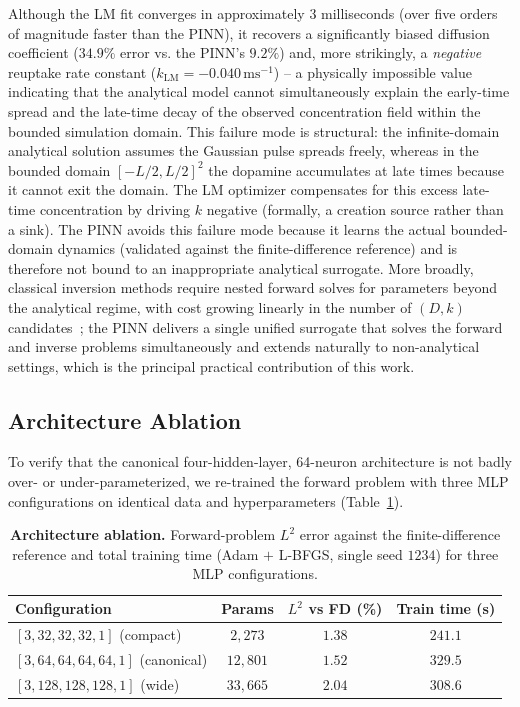 \documentclass[12pt]{article}
\begin{document}
Although the LM fit converges in approximately $3$ milliseconds (over
five orders of magnitude faster than the PINN), it recovers a
significantly biased diffusion coefficient ($34.9\%$ error vs. the
PINN's $9.2\%$) and, more strikingly, a \emph{negative} reuptake rate
constant ($k_{\mathrm{LM}} = -0.040\,\text{ms}^{-1}$) -- a physically
impossible value indicating that the analytical model cannot
simultaneously explain the early-time spread and the late-time decay of
the observed concentration field within the bounded simulation domain.
This failure mode is structural: the infinite-domain analytical
solution assumes the Gaussian pulse spreads freely, whereas in the
bounded domain $[-L/2, L/2]^2$ the dopamine accumulates at late times
because it cannot exit the domain. The LM optimizer compensates for
this excess late-time concentration by driving $k$ negative (formally,
a creation source rather than a sink). The PINN avoids this failure
mode because it learns the actual bounded-domain dynamics (validated
against the finite-difference reference) and is therefore not bound to
an inappropriate analytical surrogate. More broadly, classical
inversion methods require nested forward solves for parameters
beyond the analytical regime, with cost growing linearly in the number
of $(D, k)$ candidates~\cite{Wiencke2020}; the PINN delivers a
single unified surrogate that solves the forward and inverse problems
simultaneously and extends naturally to non-analytical settings, which
is the principal practical contribution of this work.

\subsection{Architecture Ablation}
\label{sec:res_arch_ablation}

To verify that the canonical four-hidden-layer, 64-neuron
architecture is not badly over- or under-parameterized, we
re-trained the forward problem with three MLP configurations on
identical data and hyperparameters (Table~\ref{tab:arch_ablation}).

\begin{table}[h!]
\centering
\caption{\textbf{Architecture ablation.}
Forward-problem $L^2$ error against the finite-difference reference and
total training time (Adam $+$ L-BFGS, single seed $1234$) for three
MLP configurations.}
\label{tab:arch_ablation}
\begin{tabular}{lccc}
\toprule
\textbf{Configuration}                 & \textbf{Params} & \textbf{$L^2$ vs FD (\%)} & \textbf{Train time (s)} \\
\midrule
$[3, 32, 32, 32, 1]$ (compact)         & $2{,}273$  & $1.38$ & $241.1$ \\
$[3, 64, 64, 64, 64, 1]$ (canonical)   & $12{,}801$ & $1.52$ & $329.5$ \\
$[3, 128, 128, 128, 1]$ (wide)         & $33{,}665$ & $2.04$ & $308.6$ \\
\bottomrule
\end{tabular}
\end{table}
\end{document}
